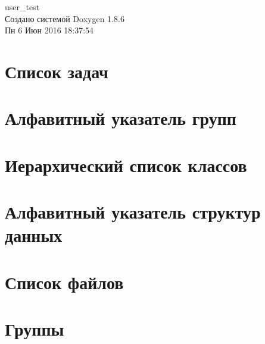 \documentclass[twoside]{book}
\newcommand{\clearemptydoublepage}{%
  \newpage{\pagestyle{empty}\cleardoublepage}%
}
\begin{document}
\hypersetup{pageanchor=false}
\begin{titlepage}
\vspace*{7cm}
\begin{center}%
{\Large user\-\_\-test }\\
\vspace*{1cm}
{\large Создано системой Doxygen 1.8.6}\\
\vspace*{0.5cm}
{\small Пн 6 Июн 2016 18:37:54}\\
\end{center}
\end{titlepage}
\clearemptydoublepage
\tableofcontents
\clearemptydoublepage
{}
\hypersetup{pageanchor=true}

\chapter{Список задач}
\label{todo}
\hypertarget{todo}{}

\chapter{Алфавитный указатель групп}

\chapter{Иерархический список классов}

\chapter{Алфавитный указатель структур данных}

\chapter{Список файлов}

\chapter{Группы}

















\end{document}
